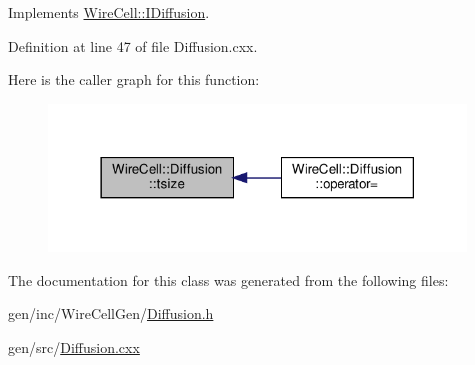 Implements \hyperlink{class_wire_cell_1_1_i_diffusion_affce6824ad0e746270f0b6b27177584e}{Wire\+Cell\+::\+I\+Diffusion}.



Definition at line 47 of file Diffusion.\+cxx.

Here is the caller graph for this function\+:
\nopagebreak
\begin{figure}[H]
\begin{center}
\leavevmode
\includegraphics[width=314pt]{class_wire_cell_1_1_diffusion_a0833d46be2aba6c268fef7dbd7fc2245_icgraph}
\end{center}
\end{figure}


The documentation for this class was generated from the following files\+:\begin{DoxyCompactItemize}
\item 
gen/inc/\+Wire\+Cell\+Gen/\hyperlink{_diffusion_8h}{Diffusion.\+h}\item 
gen/src/\hyperlink{_diffusion_8cxx}{Diffusion.\+cxx}\end{DoxyCompactItemize}
